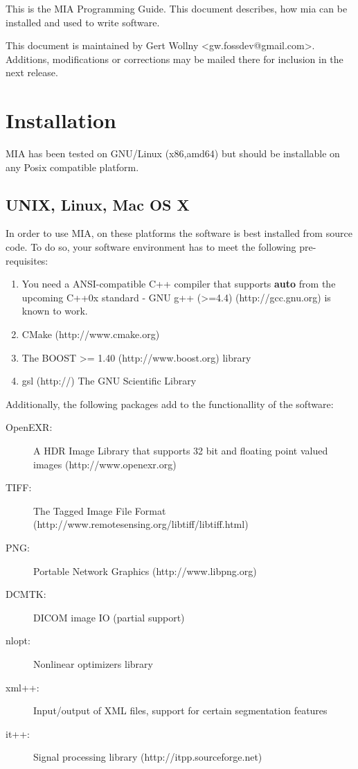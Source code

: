 \documentclass[english, 10pt, a4paper,headsepline,openany]{scrbook}
\begin{document}
This is the MIA Programming Guide. This document describes, how mia can be installed and used to 
  write software. 

This document is maintained by Gert Wollny <gw.fossdev@gmail.com>. 
Additions, modifications or corrections may be mailed there for inclusion in the next release. 

\section{Installation}

MIA has been tested on GNU/Linux (x86,amd64) but should be installable on any Posix compatible platform. 


\subsection{UNIX, Linux, Mac OS X} 

In order to use MIA, on these platforms the software is best installed from source code. 
To do so, your software environment has to meet the following pre-requisites: 

\begin{enumerate}
\item You need a ANSI-compatible C++ compiler that supports {\bf auto} from the upcoming 
   C++0x standard - GNU g++ (>=4.4) (http://gcc.gnu.org) is known to work. 
\item CMake (http://www.cmake.org) 
\item The BOOST >= 1.40 (http://www.boost.org) library
\item gsl (http://) The GNU Scientific Library 
\end{enumerate}

Additionally, the following packages add to the functionallity of the software: 

\begin{description}
\item [OpenEXR:] A HDR Image Library that supports 32 bit and floating point valued images (http://www.openexr.org)
\item [TIFF:]    The Tagged Image File Format (http://www.remotesensing.org/libtiff/libtiff.html)
\item [PNG:]     Portable Network Graphics (http://www.libpng.org)
\item [DCMTK:]   DICOM image IO (partial support) 
\item [nlopt:]   Nonlinear optimizers library 
\item [xml++:]   Input/output of XML files, support for certain segmentation features
\item [it++:]    Signal processing library (http://itpp.sourceforge.net) 
\end{description}
\end{document}
